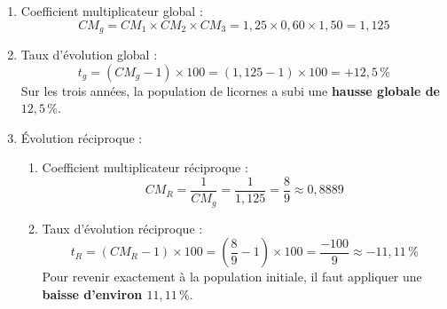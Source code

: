 \begin{exercice}
\begin{correction}
\begin{enumerate}
			\item {Coefficient multiplicateur global :}
			      \[
				      CM_g = CM_1 \times CM_2 \times CM_3 = 1{,}25 \times 0{,}60 \times 1{,}50 = 1{,}125
			      \]

			\item {Taux d'évolution global :}
			      \[
				      t_g = (CM_g - 1) \times 100 = (1{,}125 - 1) \times 100 = +12{,}5\,\%
			      \]
			      Sur les trois années, la population de licornes a subi une \textbf{hausse globale de $12{,}5\,\%$}.

			\item {Évolution réciproque :}
			      \begin{enumerate}
				      \item {Coefficient multiplicateur réciproque :}
				            \[
					            CM_R = \frac{1}{CM_g} = \frac{1}{1{,}125} = \frac{8}{9} \approx 0{,}8889
				            \]

				      \item {Taux d'évolution réciproque :}
				            \[
					            t_R = (CM_R - 1) \times 100 = \left( \frac{8}{9} - 1 \right) \times 100 = \frac{-100}{9} \approx -11{,}11\,\%
				            \]
				            Pour revenir exactement à la population initiale, il faut appliquer une \textbf{baisse d'environ $11{,}11\,\%$}.
			      \end{enumerate}
		\end{enumerate}
	\end{correction}
\end{exercice}
